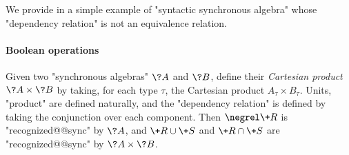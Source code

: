 We provide in 
a simple example of "syntactic synchronous algebra" whose "dependency relation"
is not an equivalence relation.  



\paragraph*{Boolean operations}
\AP Given two "synchronous algebras" $\?A$ and $\?B$, define their \emph{Cartesian product}
$\?A \times \?B$ by taking, for each type $\tau$, the Cartesian product $A_\tau \times B_\tau$. 
Units, "product" are defined naturally, and the "dependency relation" is defined
by taking the conjunction over each component.
Then $\negrel \+R$ is "recognized@@sync" by $\?A$, and
$\+R \cup \+S$ and $\+R \cap \+S$ are "recognized@@sync" by $\?A \times \?B$. 


